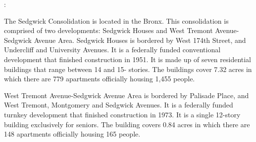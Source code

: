 :  

The Sedgwick Consolidation is located in the Bronx. This consolidation is comprised of two developments: Sedgwick Houses and West Tremont Avenue-Sedgwick Avenue Area. Sedgwick Houses is bordered by West 174th Street, and Undercliff and University Avenues. It is a federally funded conventional development that finished construction in 1951. It is made up of seven residential buildings that range between 14 and 15- stories. The buildings cover 7.32 acres in which there are 779 apartments officially housing 1,455 people.   

  

West Tremont Avenue-Sedgwick Avenue Area is bordered by Palisade Place, and West Tremont, Montgomery and Sedgwick Avenues. It is a federally funded turnkey development that finished construction in 1973. It is a single 12-story building exclusively for seniors. The building covers 0.84 acres in which there are 148 apartments officially housing 165 people.   

 